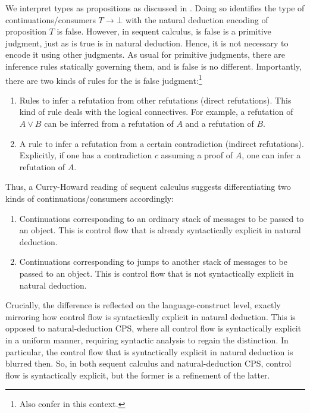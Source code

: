 We interpret types as propositions as discussed in \cite{10.1145/2699407}.
Doing so identifies the type of continuations/consumers $T \to \bot$ with the natural deduction encoding of {\glqq}proposition $T$ is false{\grqq}.
However, in sequent calculus, {\glqq}is false{\grqq} is a primitive judgment, just as {\glqq}is true{\grqq} is in natural deduction.
Hence, it is not necessary to encode it using other judgments.
As usual for primitive judgments, there are inference rules statically governing them, and {\glqq}is false{\grqq} is no different.
Importantly, there are two kinds of rules for the {\glqq}is false{\grqq} judgment:\footnote{Also confer \cite{zeilberger2008unity} in this context.}
\begin{enumerate}
  \item
    Rules to infer a refutation from other refutations (direct refutations).
    This kind of rule deals with the logical connectives.
    For example, a refutation of $A \lor B$ can be inferred from a refutation of $A$ and a refutation of $B$.
  \item
    A rule to infer a refutation from a certain contradiction (indirect refutations).
    Explicitly, if one has a contradiction $c$ assuming a proof of $A$, one can infer a refutation of $A$.
\end{enumerate}
Thus, a Curry-Howard reading of sequent calculus suggests differentiating two kinds of continuations/consumers accordingly:
\begin{enumerate}
  \item
    Continuations corresponding to an ordinary stack of messages to be passed to an object.
    This is control flow that is already syntactically explicit in natural deduction.
\item
    Continuations corresponding to jumps to another stack of messages to be passed to an object.
    This is control flow that is not syntactically explicit in natural deduction.
\end{enumerate}
Crucially, the difference is reflected on the language-construct level, exactly mirroring how control flow is syntactically explicit in natural deduction.
This is opposed to natural-deduction CPS, where all control flow is syntactically explicit in a uniform manner, requiring syntactic analysis to regain the distinction.
In particular, the control flow that is syntactically explicit in natural deduction is blurred then.
So, in both sequent calculus and natural-deduction CPS, control flow is syntactically explicit, but the former is a refinement of the latter.
